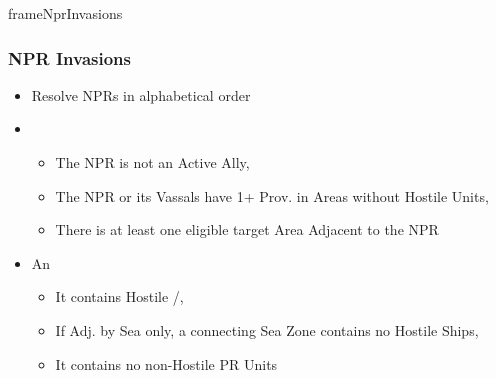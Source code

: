 \documentclass[10pt]{article}
\newlength{\fhNprInvasions} \setlength\fhNprInvasions{13\baselineskip}
\begin{document}
\addbackground
\addfooter

\begin{dynamiccontents*}{frameNprInvasions}\begin{eubox}{\fhNprInvasions}
	\begin{multicols}{2}
		\subsubsection*{NPR Invasions }
		\begin{itemize}
			\item Resolve NPRs in alphabetical order
			\item {}
			\begin{itemize}
				\item The NPR is not an Active Ally, 
				\item The NPR or its Vassals have 1+ Prov. in Areas without Hostile Units, 
				\item There is at least one eligible target Area Adjacent to the NPR
			\end{itemize}
			\item An 
			\begin{itemize}
				\item It contains Hostile \towns/\vassals, 
				\item If Adj. by Sea only, a connecting Sea Zone contains no Hostile Ships, 
				\item It contains no non-Hostile PR Units
			\end{itemize}
		\end{itemize}

\end{multicols}
\end{eubox}
\end{dynamiccontents*}
\end{document}
